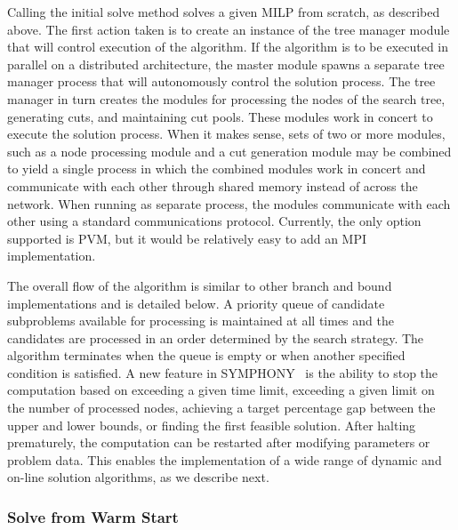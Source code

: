 Calling the initial solve method solves a given MILP from scratch, as
described above. The first action taken is to create an instance of the tree
manager module that will control execution of the algorithm. If the algorithm
is to be executed in parallel on a distributed architecture, the master module
spawns a separate tree manager process that will autonomously control the
solution process. The tree manager in turn creates the modules for processing
the nodes of the search tree, generating cuts, and maintaining cut pools.
These modules work in concert to execute the solution process. When it makes
sense, sets of two or more modules, such as a node processing module and a cut
generation module may be combined to yield a single process in which the
combined modules work in concert and communicate with each other through
shared memory instead of across the network. When running as separate process,
the modules communicate with each other using a standard communications
protocol. Currently, the only option supported is PVM, but it would be
relatively easy to add an MPI implementation.

The overall flow of the algorithm is similar to other branch and bound
implementations and is detailed below. A priority queue of candidate
subproblems available for processing is maintained at all times and the
candidates are processed in an order determined by the search strategy. The
algorithm terminates when the queue is empty or when another specified
condition is satisfied. A new feature in SYMPHONY \VER\  is the ability to stop
the computation based on exceeding a given time limit, exceeding a given limit
on the number of processed nodes, achieving a target percentage gap between
the upper and lower bounds, or finding the first feasible solution. After
halting prematurely, the computation can be restarted after modifying
parameters or problem data. This enables the implementation of a wide range of
dynamic and on-line solution algorithms, as we describe next.

\subsubsection{Solve from Warm Start} \label{warm_solve}

